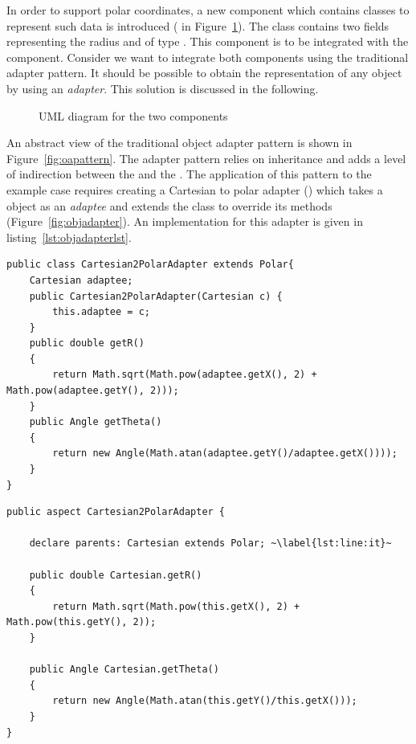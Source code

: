 In order to support polar coordinates, a new component which contains classes to represent such data is introduced ( in Figure~\ref{fig:components}). The class  contains two fields  representing the radius and  of type . This component is to be integrated with the  component. 
Consider we want to integrate both components using the traditional adapter pattern. 
It should be possible to obtain the  representation of any  object by using an \emph{adapter}.
This solution is discussed in the following.

\begin{figure}
\centering

\label{fig:components}
\caption{UML diagram for the two components}
\end{figure}

An abstract view of the traditional object adapter pattern is shown in Figure~\ref{fig:oapattern}. The adapter pattern relies on inheritance and adds a level of indirection between the  and the . The application of this pattern to the example case requires creating a Cartesian to polar adapter () which takes a  object as an \emph{adaptee} and extends the  class to override its methods (Figure~\ref{fig:objadapter}). An implementation for this adapter is given in listing~\ref{lst:objadapterlst}.


\newsavebox{\cartesiantopolar}
\begin{lrbox}{\cartesiantopolar}
\begin{lstlisting}
public class Cartesian2PolarAdapter extends Polar{
	Cartesian adaptee;
	public Cartesian2PolarAdapter(Cartesian c) {
		this.adaptee = c;
	}
	public double getR()
	{
		return Math.sqrt(Math.pow(adaptee.getX(), 2) + Math.pow(adaptee.getY(), 2)));
	}
	public Angle getTheta()
	{
		return new Angle(Math.atan(adaptee.getY()/adaptee.getX())));
	}
}
	\end{lstlisting}
\end{lrbox}

\newsavebox{\cartesiantopolaraop}
\begin{lrbox}{\cartesiantopolaraop}
\begin{lstlisting}
public aspect Cartesian2PolarAdapter {

	declare parents: Cartesian extends Polar; ~\label{lst:line:it}~

	public double Cartesian.getR()
	{
		return Math.sqrt(Math.pow(this.getX(), 2) + Math.pow(this.getY(), 2));
	}
	
	public Angle Cartesian.getTheta()
	{
		return new Angle(Math.atan(this.getY()/this.getX()));
	}
}

	\end{lstlisting}
\end{lrbox}


